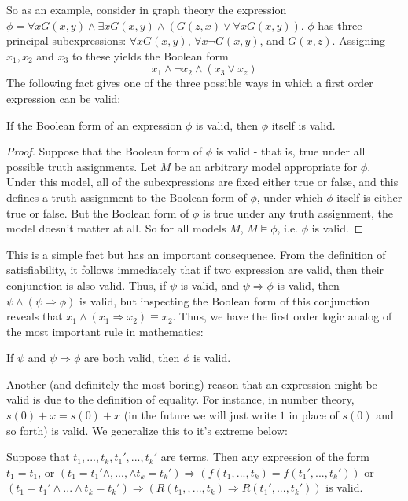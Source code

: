 So as an example, consider in graph theory the expression $\phi = \forall x G(x,y) \wedge \exists x G(x,y) \wedge (G(z,x) \vee \forall x G(x,y))$. $\phi$ has three principal subexpressions: $\forall x G(x,y)$, $\forall x \neg G(x,y)$, and $G(x,z)$. Assigning $x_1,x_2$ and $x_3$ to these yields the Boolean form 
\[ x_1 \wedge \neg x_2 \wedge (x_3 \vee x_z) \]
The following fact gives one of the three possible ways in which a first order expression can be valid:
\begin{fact}
    If the Boolean form of an expression $\phi$ is valid, then $\phi$ itself is valid.
\end{fact}
\begin{proof}
    Suppose that the Boolean form of $\phi$ is valid - that is, true under all possible truth assignments. Let $M$ be an arbitrary model appropriate for $\phi$. Under this model, all of the subexpressions are fixed either true or false, and this defines a truth assignment to the Boolean form of $\phi$, under which $\phi$ itself is either true or false. But the Boolean form of $\phi$ is true under any truth assignment, the model doesn't matter at all. So for all models $M$, $M \models \phi$, i.e. $\phi$ is valid.
\end{proof}
This is a simple fact but has an important consequence. From the definition of satisfiability, it follows immediately that if two expression are valid, then their conjunction is also valid. Thus, if $\psi$ is valid, and $\psi \Rightarrow \phi$ is valid, then $\psi \wedge (\psi \Rightarrow \phi)$ is valid, but inspecting the Boolean form of this conjunction reveals that $x_1 \wedge (x_1 \Rightarrow x_2) \equiv x_2$. Thus, we have the first order logic analog of the most important rule in mathematics:
\begin{fact}
    If $\psi$ and $\psi \Rightarrow \phi$ are both valid, then $\phi$ is valid.
\end{fact}
Another (and definitely the most boring) reason that an expression might be valid is due to the definition of equality. For instance, in number theory, $s(0)+x = s(0)+x$ (in the future we will just write $1$ in place of $s(0)$ and so forth) is valid. We generalize this to it's extreme below:
\begin{fact}
    Suppose that $t_1,...,t_k,t_1',...,t_k'$ are terms. Then any expression of the form $t_1 = t_1$, or $(t_1 = t_1' \wedge,...,\wedge t_k = t_k') \Rightarrow (f(t_1,...,t_k) = f(t_1',...,t_k'))$ or $(t_1 = t_1' \wedge ... \wedge t_k = t_k') \Rightarrow (R(t_1,,...,t_k) \Rightarrow R(t_1',...,t_k'))$ is valid. 
\end{fact}
